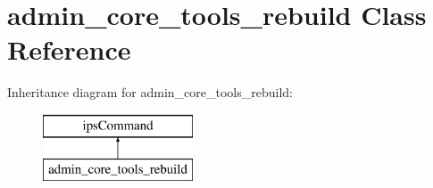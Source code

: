 \hypertarget{classadmin__core__tools__rebuild}{\section{admin\-\_\-core\-\_\-tools\-\_\-rebuild Class Reference}
\label{classadmin__core__tools__rebuild}
}
Inheritance diagram for admin\-\_\-core\-\_\-tools\-\_\-rebuild\-:\begin{figure}[H]
\begin{center}
\leavevmode
\includegraphics[height=2.000000cm]{classadmin__core__tools__rebuild}
\end{center}
\end{figure}
